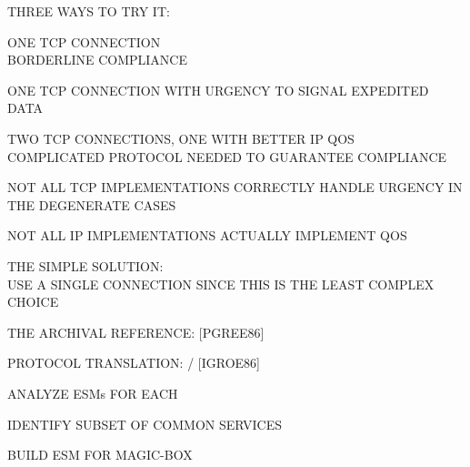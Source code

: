 \begin{bwslide}

THREE WAYS TO TRY IT:
\begin{nrtc}
\item	ONE TCP CONNECTION\\
	BORDERLINE COMPLIANCE

\item	ONE TCP CONNECTION WITH URGENCY TO SIGNAL EXPEDITED DATA

\item	TWO TCP CONNECTIONS, ONE WITH BETTER IP QOS\\
	COMPLICATED PROTOCOL NEEDED TO GUARANTEE COMPLIANCE
\end{nrtc}
\end{bwslide}


\begin{bwslide}

\begin{nrtc}
\item	NOT ALL TCP IMPLEMENTATIONS CORRECTLY HANDLE URGENCY IN THE
	DEGENERATE CASES

\item	NOT ALL IP IMPLEMENTATIONS ACTUALLY IMPLEMENT QOS

\item	THE SIMPLE SOLUTION:\\
	USE A SINGLE CONNECTION SINCE THIS IS THE LEAST COMPLEX CHOICE
\end{nrtc}
\end{bwslide}


\begin{bwslide}

\begin{nrtc}
\item	THE ARCHIVAL REFERENCE: [PGREE86]

\item	PROTOCOL TRANSLATION: \tcptpgw/ [IGROE86]
    \begin{nrtc}
    \item	ANALYZE ESMs FOR EACH
    \item	IDENTIFY SUBSET OF COMMON SERVICES
    \item	BUILD ESM FOR MAGIC-BOX
    \end{nrtc}
\end{nrtc}
\end{bwslide}


